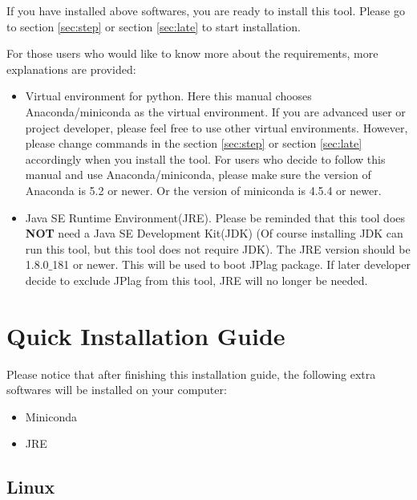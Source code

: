 \documentclass[twoside,a4paper]{refart}
\begin{document}
If you have installed above softwares, you are ready to install this tool. Please go to section \ref{sec:step} or section \ref{sec:late} to start installation.

For those users who would like to know more about the requirements, more explanations are provided:

\begin{itemize}

\item Virtual environment for python. Here this manual chooses Anaconda/miniconda as the virtual environment. If you are advanced user or project developer, please feel free to use other virtual environments. However, please change commands in the section \ref{sec:step} or section \ref{sec:late} accordingly when you install the tool. For users who decide to follow this manual and use Anaconda/miniconda, please make sure the version of Anaconda is 5.2 or newer. Or the version of miniconda is 4.5.4 or newer.

\item Java SE Runtime Environment(JRE). Please be reminded that this tool does \textbf{NOT} need a Java SE Development Kit(JDK) (Of course installing JDK can run this tool, but this tool does not require JDK). The JRE version should be 1.8.0$\_$181 or newer. This will be used to boot JPlag package. If later developer decide to exclude JPlag from this tool, JRE will no longer be needed.

\end{itemize}


\section{Quick Installation Guide} \label{sec:quic}
Please notice that after finishing this installation guide, the following extra softwares will be installed on your computer:

\begin{itemize}

\item Miniconda

\item JRE

\end{itemize}

\subsection{Linux} \label{quic_subsec:linux}
\end{document}
